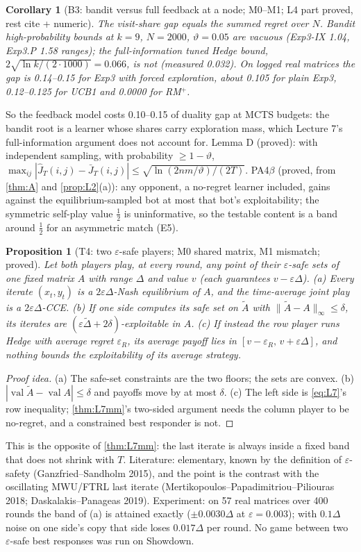 \documentclass[10pt]{article}
\theoremstyle{plain}
\newtheorem{proposition}[theorem]{Proposition}
\newtheorem{corollary}[theorem]{Corollary}
\theoremstyle{definition}
\theoremstyle{remark}
\DeclareMathOperator{\val}{val}
\begin{document}
\begin{corollary}[B3: bandit versus full feedback at a node; M0--M1; L4 part proved, rest cite + numeric]\label{cor:B3}
The visit-share gap equals the summed regret over $N$. Bandit high-probability bounds at $k=9$, $N=2000$,
$\vartheta=0.05$ are vacuous (Exp3-IX 1.04, Exp3.P 1.58 ranges); the full-information tuned Hedge bound,
$2\sqrt{\ln k/(2\cdot1000)}=0.066$, is not (measured 0.032). On logged real matrices the gap is 0.14--0.15 for Exp3
with forced exploration, about 0.105 for plain Exp3, 0.12--0.125 for UCB1 and 0.0000 for RM$^+$.
\end{corollary}
So the feedback model costs 0.10--0.15 of duality gap at MCTS budgets: the bandit root is a learner whose shares carry
exploration mass, which Lecture 7's full-information argument does not account for. Lemma D (proved): with independent
sampling, with probability $\ge1-\vartheta$, $\max_{ij}|\hat J_T(i,j)-\bar J_T(i,j)|\le\sqrt{\ln(2nm/\vartheta)/(2T)}$.
PA4$\beta$ (proved, from \cref{thm:A} and \cref{prop:L2}(a)): any opponent, a no-regret learner included, gains against
the equilibrium-sampled bot at most that bot's exploitability; the symmetric self-play value $\tfrac12$ is uninformative,
so the testable content is a band around $\tfrac12$ for an asymmetric match (E5).

\begin{proposition}[T4: two $\varepsilon$-safe players; M0 shared matrix, M1 mismatch; proved]\label{prop:T4}
Let both players play, at every round, any point of their $\varepsilon$-safe sets of one fixed matrix $A$ with range $\Delta$ and
value $v$ (each guarantees $v-\varepsilon\Delta$). (a) Every iterate $(x_t,y_t)$ is a $2\varepsilon\Delta$-Nash equilibrium of $A$, and
the time-average joint play is a $2\varepsilon\Delta$-CCE. (b) If one side computes its safe set on $\tilde A$ with
$\|\tilde A-A\|_\infty\le\delta$, its iterates are $(\varepsilon\tilde\Delta+2\delta)$-exploitable in $A$. (c) If instead the row player runs
Hedge with average regret $\varepsilon_R$, its average payoff lies in $[v-\varepsilon_R,\,v+\varepsilon\Delta]$, and nothing bounds the
exploitability of its average strategy.
\end{proposition}
\begin{proof}[Proof idea] (a) The safe-set constraints are the two floors; the sets are convex. (b) $|\val\tilde A-\val A|\le\delta$
and payoffs move by at most $\delta$. (c) The left side is \cref{eq:L7}'s row inequality; \cref{thm:L7mm}'s two-sided
argument needs the column player to be no-regret, and a constrained best responder is not. \end{proof}
This is the opposite of \cref{thm:L7mm}: the last iterate is always inside a fixed band that does not shrink with $T$.
Literature: elementary, known by the definition of $\varepsilon$-safety (Ganzfried--Sandholm 2015), and the point is the
contrast with the oscillating MWU/FTRL last iterate (Mertikopoulos--Papadimitriou--Piliouras 2018; Daskalakis--Panageas
2019). Experiment: on 57 real matrices over 400 rounds the band of (a) is attained exactly ($\pm0.0030\Delta$ at
$\varepsilon=0.003$); with $0.1\Delta$ noise on one side's copy that side loses $0.017\Delta$ per round. No game between two $\varepsilon$-safe best responses
was run on Showdown.
\end{document}
